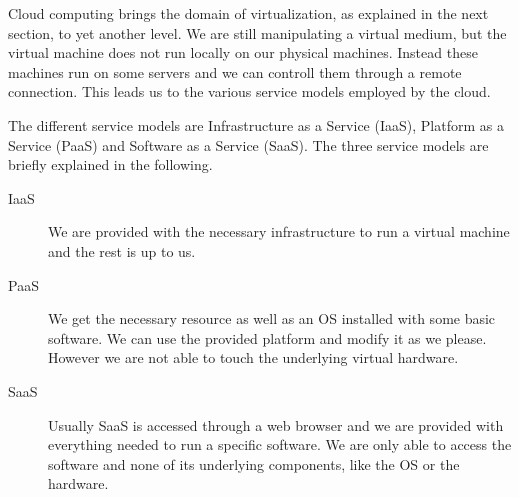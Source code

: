 Cloud computing brings the domain of virtualization, as explained in
the next section, to yet another level. We are still manipulating a
virtual medium, but the virtual machine does not run locally on our
physical machines. Instead these machines run on some servers and we
can controll them through a remote connection. This leads us to the
various service models employed by the cloud.

The different service models are Infrastructure as a Service (IaaS),
Platform as a Service (PaaS) and Software as a Service (SaaS). The
three service models are briefly explained in the following.
\begin{description}

	\item[IaaS] We are provided with the necessary
	infrastructure to run a virtual machine and the rest is up to us.

	\item[PaaS] We get the necessary resource as well as an OS
	installed with some basic software. We can use the provided platform
	and modify it as we please. However we are not able to touch the
	underlying virtual hardware.

	\item[SaaS] Usually SaaS is accessed through a web browser and we
	are provided with everything needed to run a specific software. We
	are only able to access the software and none of its underlying
	components, like the OS or the hardware.

\end{description}
